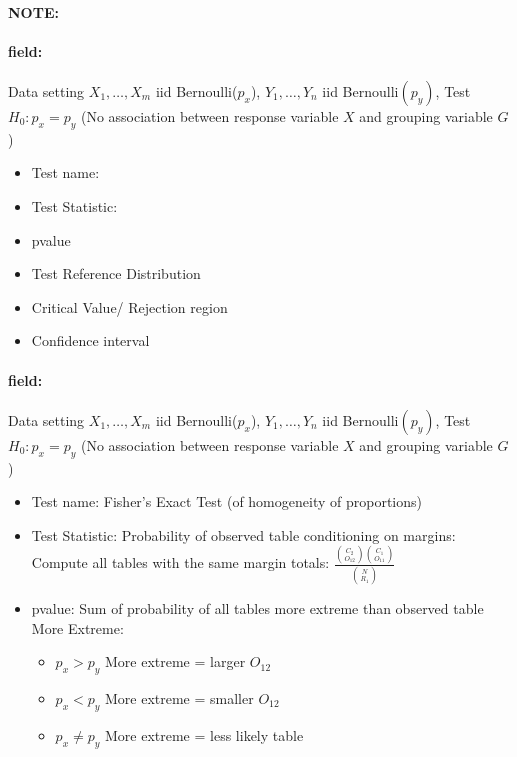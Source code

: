 \documentclass[12pt]{article}
\newenvironment{note}{\paragraph{NOTE:}}{}
\newenvironment{field}{\paragraph{field:}}{}
\begin{document}
\begin{note}
  \begin{field}
  Data setting $X_1, \ldots , X_m$ iid Bernoulli($p_x$), $Y_1, \ldots, Y_n$ iid Bernoulli$(p_y)$, Test $H_0: p_x = p_y $ (No association between response variable $X$ and grouping variable $G$)
  \begin{itemize}
    \item Test name:
    \item Test Statistic:
    \item pvalue
    \item Test Reference Distribution
    \item Critical Value/ Rejection region
    \item Confidence interval
  \end{itemize}
\end{field}
\begin{field}
Data setting $X_1, \ldots , X_m$ iid Bernoulli($p_x$), $Y_1, \ldots, Y_n$ iid Bernoulli$(p_y)$, Test $H_0: p_x = p_y $ (No association between response variable $X$ and grouping variable $G$)
\begin{itemize}
  \item Test name: Fisher's Exact Test (of homogeneity of proportions)
  \item Test Statistic: Probability of observed table conditioning on margins: Compute all tables with the same margin totals: $\frac{\binom{C_2}{O_{12}}\binom{C_1}{O_{11}}}{\binom{N}{R_1}}$
  \item pvalue: Sum of probability of all tables more extreme than observed table
  More Extreme:
  \begin{itemize}
    \item $p_x > p_y$ More extreme = larger $O_{12}$
    \item $p_x < p_y$ More extreme = smaller $O_{12}$
    \item $p_x \neq p_y$ More extreme = less likely table
  \end{itemize}
\end{itemize}
\end{field}
\end{note}
\end{document}
